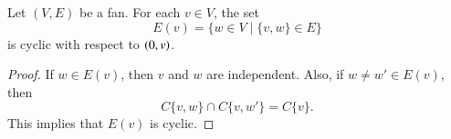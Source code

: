 


\begin{lemma}  Let $(V,E)$ be a fan.
For each $v\in V$, the set
        $$
        E(v) = \{w\in V\mid \{v,w\}\in E\}
        $$
        is cyclic with respect to $(0,v)$.
\end{lemma}

\begin{proof}  If $w\in E(v)$, then $v$ and $w$ are independent.
Also, if $w\ne w'\in E(v)$, then
$$
C\{v,w\}\cap C\{v,w'\} = C\{v\}.
$$
This implies that $E(v)$ is cyclic.
\end{proof}

